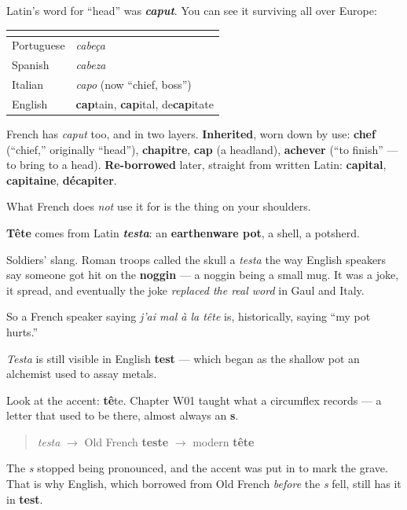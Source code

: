 \begin{cousinweb}
Latin's word for \textquotedblleft{}head\textquotedblright{} was \emph{\textbf{caput}}. You can see it surviving all over Europe:

\noindent
\begin{tabularx}{\linewidth}{@{}>{\raggedright\arraybackslash}X>{\raggedright\arraybackslash}X@{}}
\toprule
\textbf{} & \textbf{} \\
\midrule
Portuguese & \emph{cabeça} \\
Spanish & \emph{cabeza} \\
Italian & \emph{capo} (now \textquotedblleft{}chief, boss\textquotedblright{}) \\
English & \textbf{cap}tain, \textbf{cap}ital, de\textbf{cap}itate \\
\bottomrule
\end{tabularx}

French has \emph{caput} too, and in two layers. \textbf{Inherited}, worn down by use: \textbf{chef} (\textquotedblleft{}chief,\textquotedblright{} originally \textquotedblleft{}head\textquotedblright{}), \textbf{chapitre}, \textbf{cap} (a headland), \textbf{achever} (\textquotedblleft{}to finish\textquotedblright{} — to bring to a head). \textbf{Re-borrowed} later, straight from written Latin: \textbf{capital}, \textbf{capitaine}, \textbf{décapiter}.

What French does \emph{not} use it for is the thing on your shoulders.

\textbf{Tête} comes from Latin \emph{\textbf{testa}}: an \textbf{earthenware pot}, a shell, a potsherd.
\end{cousinweb}

\begin{culture}
Soldiers' slang. Roman troops called the skull a \emph{testa} the way English speakers say someone got hit on the \textbf{noggin} — a noggin being a small mug. It was a joke, it spread, and eventually the joke \emph{replaced the real word} in Gaul and Italy.

So a French speaker saying \emph{j'ai mal à la tête} is, historically, saying \textquotedblleft{}my pot hurts.\textquotedblright{}

\emph{Testa} is still visible in English \textbf{test} — which began as the shallow pot an alchemist used to assay metals.
\end{culture}

\begin{sounds}
Look at the accent: \textbf{tê}te. Chapter W01 taught what a circumflex records — a letter that used to be there, almost always an \textbf{s}.

\begin{quote}
\emph{testa} $\to$ Old French \textbf{teste} $\to$ modern \textbf{tête}
\end{quote}

The \emph{s} stopped being pronounced, and the accent was put in to mark the grave. That is why English, which borrowed from Old French \emph{before} the \emph{s} fell, still has it in \textbf{test}.
\end{sounds}

